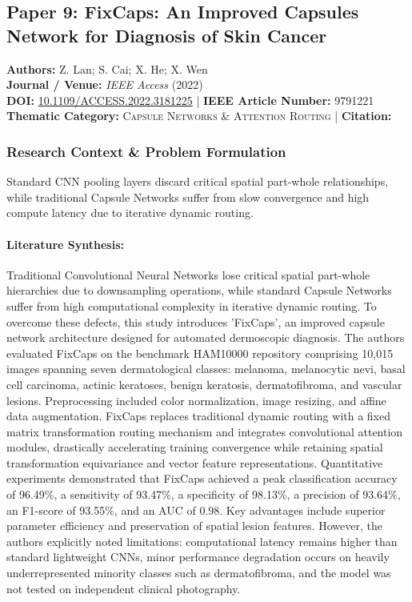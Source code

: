 \subsection{Paper 9: FixCaps: An Improved Capsules Network for Diagnosis of Skin Cancer}
\label{sec:paper_9}

\begin{tcolorbox}[colback=gray!5!white,colframe=gray!75!black,title=\textbf{Metadata \& Citation Summary}]
\textbf{Authors:} Z. Lan; S. Cai; X. He; X. Wen \\
\textbf{Journal / Venue:} \textit{IEEE Access} (2022) \\
\textbf{DOI:} \href{https://doi.org/10.1109/ACCESS.2022.3181225}{10.1109/ACCESS.2022.3181225} \quad | \quad \textbf{IEEE Article Number:} 9791221 \\
\textbf{Thematic Category:} \textsc{Capsule Networks \& Attention Routing} \quad | \quad \textbf{Citation:} \cite{9791221}
\end{tcolorbox}

\subsubsection*{Research Context \& Problem Formulation}
Standard CNN pooling layers discard critical spatial part-whole relationships, while traditional Capsule Networks suffer from slow convergence and high compute latency due to iterative dynamic routing.

\paragraph{Literature Synthesis:} Traditional Convolutional Neural Networks lose critical spatial part-whole hierarchies due to downsampling operations, while standard Capsule Networks suffer from high computational complexity in iterative dynamic routing. To overcome these defects, this study introduces 'FixCaps', an improved capsule network architecture designed for automated dermoscopic diagnosis. The authors evaluated FixCaps on the benchmark HAM10000 repository comprising 10,015 images spanning seven dermatological classes: melanoma, melanocytic nevi, basal cell carcinoma, actinic keratoses, benign keratosis, dermatofibroma, and vascular lesions. Preprocessing included color normalization, image resizing, and affine data augmentation. FixCaps replaces traditional dynamic routing with a fixed matrix transformation routing mechanism and integrates convolutional attention modules, drastically accelerating training convergence while retaining spatial transformation equivariance and vector feature representations. Quantitative experiments demonstrated that FixCaps achieved a peak classification accuracy of 96.49\%, a sensitivity of 93.47\%, a specificity of 98.13\%, a precision of 93.64\%, an F1-score of 93.55\%, and an AUC of 0.98. Key advantages include superior parameter efficiency and preservation of spatial lesion features. However, the authors explicitly noted limitations: computational latency remains higher than standard lightweight CNNs, minor performance degradation occurs on heavily underrepresented minority classes such as dermatofibroma, and the model was not tested on independent clinical photography.

